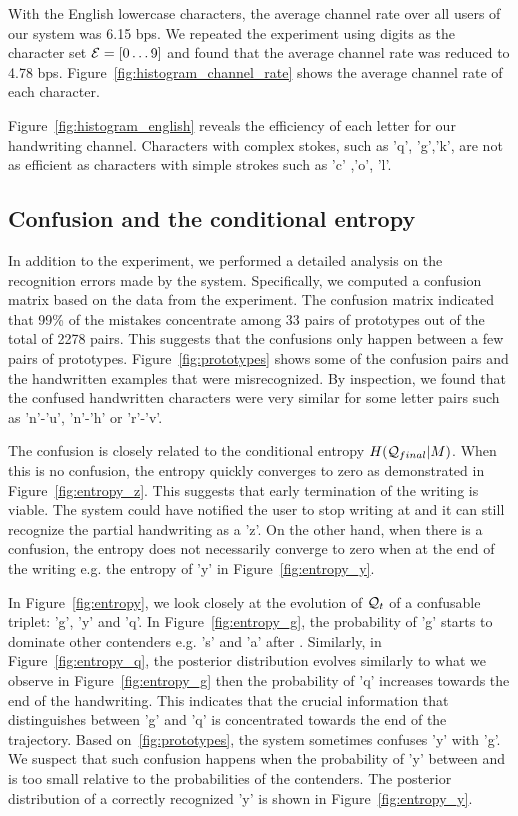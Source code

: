 \documentclass{sigchi}
\begin{document}
With the English lowercase characters, the average channel rate over
all users of our system was 6.15 bps.  We repeated the
experiment using digits as the character set $\mathcal{E} = \left[ 0
\ldots 9 \right]$ and found that the average channel rate was reduced to
4.78 bps. Figure~\ref{fig:histogram_channel_rate} shows
the average channel rate of each character. 

Figure~\ref{fig:histogram_english} reveals the efficiency of each
letter for our handwriting channel. Characters with complex stokes,
such as 'q', 'g','k', are not as efficient as characters with simple
strokes such as 'c' ,'o', 'l'. 

\subsection{Confusion and the conditional entropy}

In addition to the experiment, we performed a detailed analysis on
the recognition errors made by the system. Specifically, we computed a
confusion matrix based on the data from the experiment. The confusion
matrix indicated that 99\% of the mistakes concentrate among 33 pairs
of prototypes out of the total of 2278 pairs. This suggests that the
confusions only happen between a few pairs of
prototypes. Figure~\ref{fig:prototypes} shows some of the confusion
pairs and the handwritten examples that were misrecognized. By
inspection, we found that the confused handwritten characters were
very similar for some letter pairs such as 'n'-'u', 'n'-'h' or
'r'-'v'.

The confusion is closely related to the conditional entropy
$H(\mathcal{Q}_{final} | M)$. When this is no confusion, the entropy quickly
converges to zero as demonstrated in Figure~\ref{fig:entropy_z}. This
suggests that early termination of the writing is viable. The system
could have notified the user to stop writing at  and it can
still recognize the partial handwriting as a 'z'. On the other hand,
when there is a confusion, the entropy does not necessarily converge
to zero when at the end of the writing e.g. the entropy of 'y' in
Figure~\ref{fig:entropy_y}.

In Figure~\ref{fig:entropy}, we look closely at the evolution of
$\mathcal{Q}_{t}$ of a confusable triplet: 'g', 'y' and 'q'. In
Figure~\ref{fig:entropy_g}, the probability of 'g' starts to dominate
other contenders e.g. 's' and 'a' after . Similarly, in
Figure~\ref{fig:entropy_q}, the posterior distribution evolves
similarly to what we observe in Figure~\ref{fig:entropy_g} then the
probability of 'q' increases towards the end of the handwriting. This
indicates that the crucial information that distinguishes between 'g'
and 'q' is concentrated towards the end of the trajectory. Based
on~\ref{fig:prototypes}, the system sometimes confuses 'y' with 'g'. We
suspect that such confusion happens when the probability of 'y' between
 and  is too small relative to the probabilities of the
contenders. The posterior distribution of a correctly recognized 'y'
is shown in Figure~\ref{fig:entropy_y}.
\end{document}
